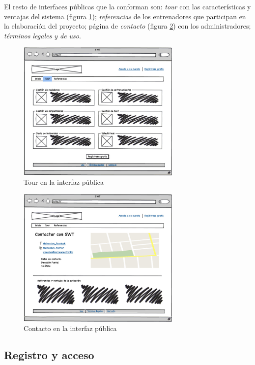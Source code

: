   		El resto de interfaces públicas que la conforman son: {\it tour} con las características y ventajas del sistema (figura \ref{fig:interfaz_publica_tour}); {\it referencias} de los entrenadores que participan en la elaboración del proyecto; página de {\it contacto} (figura \ref{fig:interfaz_publica_contacto}) con los administradores; {\it términos legales y de uso}. 

  		\begin{figure}[H]
  		  \centering
  		    \includegraphics[width=8cm]{./eps/p_interfaz/2_Tour.eps}
  		  \caption{Tour en la interfaz pública}
  		  \label{fig:interfaz_publica_tour}
  		\end{figure}

  		\begin{figure}[H]
  		  \centering
  		    \includegraphics[width=8cm]{./eps/p_interfaz/3_Contacto.eps}
  		  \caption{Contacto en la interfaz pública}
  		  \label{fig:interfaz_publica_contacto}
  		\end{figure}


  	\subsection{Registro y acceso} %
  		\label{sub:registro_y_acceso}

